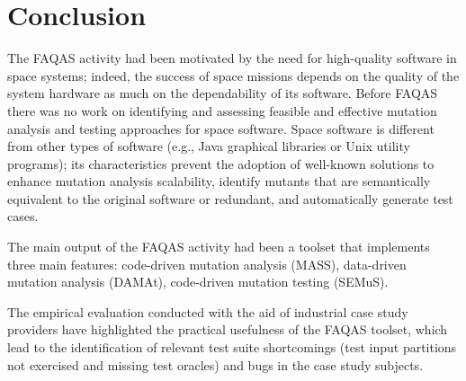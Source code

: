 
\section{Conclusion}
\label{sec:conclusion}

The FAQAS activity had been motivated by the need for high-quality software in space systems; indeed, the success of space missions depends on the quality of the system hardware as much on the dependability of its software. Before FAQAS there was no work on identifying and assessing feasible and effective mutation analysis and testing approaches for space software. Space software is different from other types of software (e.g., Java graphical libraries or Unix utility programs); its characteristics prevent the adoption of well-known solutions to enhance mutation analysis scalability, identify mutants that are semantically equivalent to the original software or redundant, and automatically generate test cases. 

The main output of the FAQAS activity had been a toolset that implements three main features: code-driven mutation analysis (MASS), data-driven mutation analysis (DAMAt), code-driven mutation testing (SEMuS).

The empirical evaluation conducted with the aid of industrial case study providers have highlighted the practical usefulness of the FAQAS toolset, which lead to the identification of relevant test suite shortcomings (test input partitions not exercised and missing test oracles) and bugs in the case study subjects.
